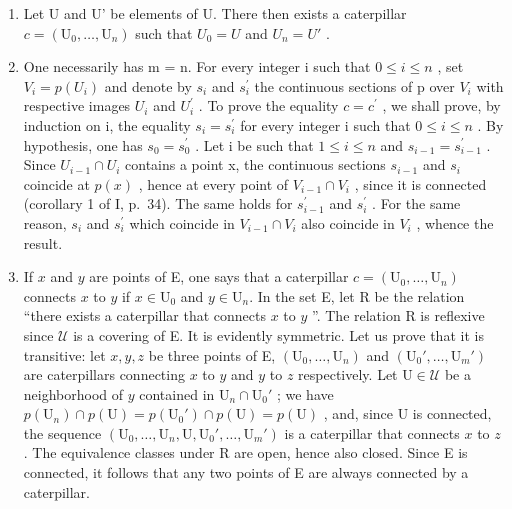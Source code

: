 \begin{enumerate}
\def\labelenumi{\alph{enumi})}
\setcounter{enumi}{1}
\item
  Let U and U' be elements of U. There then exists a caterpillar \(c = (\mathrm{U}_{0}, \ldots, \mathrm{U}_{n})\) such that \(U_{0} = U\) and \(U_{n} = U'\) .
\item
  One necessarily has m = n. For every integer i such that \(0 \leqslant i \leqslant n\) , set \(V_{i} = p(U_{i})\) and denote by \(s_{i}\) and \(s_{i}^{\prime}\) the continuous sections of p over \(V_{i}\) with respective images \(U_{i}\) and \(U_{i}^{\prime}\) . To prove the equality \(c = c^{\prime}\) , we shall prove, by induction on i, the equality \(s_{i} = s_{i}^{\prime}\) for every integer i such that \(0 \leqslant i \leqslant n\) . By hypothesis, one has \(s_{0} = s_{0}^{\prime}\) . Let i be such that \(1 \leqslant i \leqslant n\) and \(s_{i-1} = s_{i-1}^{\prime}\) . Since \(U_{i-1} \cap U_{i}\) contains a point x, the continuous sections \(s_{i-1}\) and \(s_{i}\) coincide at \(p(x)\) , hence at every point of \(V_{i-1} \cap V_{i}\) , since it is connected (corollary 1 of I, p.~34). The same holds for \(s_{i-1}^{\prime}\) and \(s_{i}^{\prime}\) . For the same reason, \(s_{i}\) and \(s_{i}^{\prime}\) which coincide in \(V_{i-1} \cap V_{i}\) also coincide in \(V_{i}\) , whence the result.
\item
  If \(x\) and \(y\) are points of E, one says that a caterpillar \(c = (\mathrm{U}_0, \ldots, \mathrm{U}_n)\) connects \(x\) to \(y\) if \(x \in \mathrm{U}_0\) and \(y \in \mathrm{U}_n\). In the set E, let R be the relation “there exists a caterpillar that connects \(x\) to \(y\) ”. The relation R is reflexive since \(\mathcal{U}\) is a covering of E. It is evidently symmetric. Let us prove that it is transitive: let \(x, y, z\) be three points of E, \((\mathrm{U}_0, \ldots, \mathrm{U}_n)\) and \((\mathrm{U}_0', \ldots, \mathrm{U}_m')\) are caterpillars connecting \(x\) to \(y\) and \(y\) to \(z\) respectively. Let \(\mathrm{U} \in \mathcal{U}\) be a neighborhood of \(y\) contained in \(\mathrm{U}_n \cap \mathrm{U}_0'\) ; we have \(p(\mathrm{U}_n) \cap p(\mathrm{U}) = p(\mathrm{U}_0') \cap p(\mathrm{U}) = p(\mathrm{U})\) , and, since U is connected, the sequence \((\mathrm{U}_0, \ldots, \mathrm{U}_n, \mathrm{U}, \mathrm{U}_0', \ldots, \mathrm{U}_m')\) is a caterpillar that connects \(x\) to \(z\) . The equivalence classes under R are open, hence also closed. Since E is connected, it follows that any two points of E are always connected by a caterpillar.
\end{enumerate}

